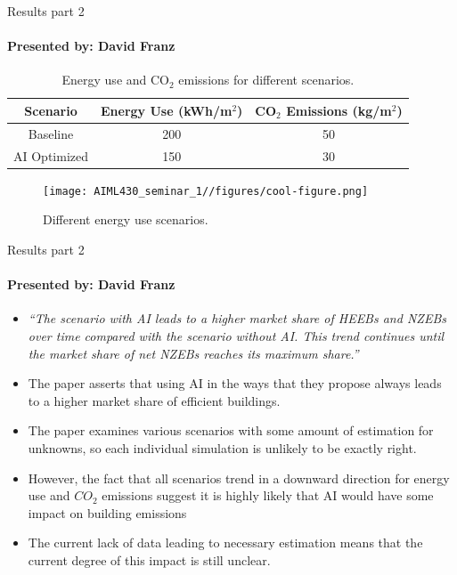 \documentclass{beamer}
\begin{document}
\begin{frame}{Results part 2}
\framesubtitle{Presented by: David Franz}
    \begin{table}
        \centering
        \begin{tabular}{|c|c|c|}
        \hline
        \textbf{Scenario} & \textbf{Energy Use (kWh/m$^2$)} & \textbf{CO$_2$ Emissions (kg/m$^2$)} \\
        \hline 
        Baseline & 200 & 50 \\
        \hline
        AI Optimized & 150 & 30 \\
        \hline
        \end{tabular}
        \caption{Energy use and CO$_2$ emissions for different scenarios.}
        \label{tab:energy-emissions}
    \end{table}
    \begin{figure}
        \centering
        \texttt{[image: AIML430\_seminar\_1//figures/cool-figure.png]}
        \caption{Different energy use scenarios.}
        \label{fig:placeholder}
    \end{figure}
\end{frame}

\begin{frame}{Results part 2}
\framesubtitle{Presented by: David Franz}
\begin{itemize}
    \item \textit{“The scenario with AI leads to a higher market share of HEEBs and NZEBs over time compared with the scenario without AI. This trend continues until the market share of net NZEBs reaches its maximum share.”}
    \item The paper asserts that using AI in the ways that they propose always leads to a higher market share of efficient buildings. 
    \item The paper examines various scenarios with some amount of estimation for unknowns, so each individual simulation is unlikely to be exactly right. 
    \item However, the fact that all scenarios trend in a downward direction for energy use and $CO_2$ emissions suggest it is highly likely that AI would have some impact on building emissions
    \item The current lack of data leading to necessary estimation means that the current degree of this impact is still unclear.
\end{itemize}
\end{frame}
\end{document}

